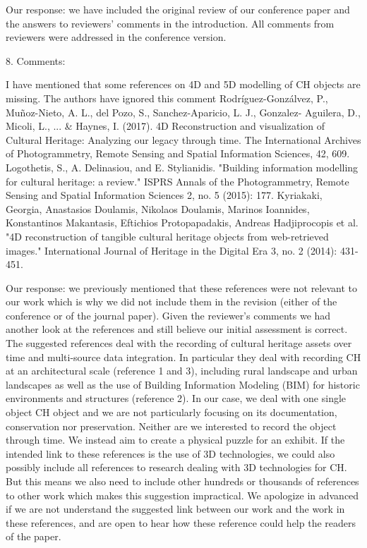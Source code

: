 \documentclass[acmlarge,screen,dvipsnames]{acmart}
\begin{document}
\greenBegin

Our response: we have included the original review of our conference paper and the answers to reviewers’ comments  in the introduction. All comments from reviewers were addressed in the conference version.

\greenEnd


8. Comments:

I have mentioned that some references on 4D and 5D modelling of CH objects are missing. The authors have ignored this comment
Rodríguez-Gonzálvez, P., Muñoz-Nieto, A. L., del Pozo, S., Sanchez-Aparicio, L. J., Gonzalez- Aguilera, D., Micoli, L., ... \& Haynes, I. (2017). 4D Reconstruction and visualization of Cultural Heritage: Analyzing our legacy through time. The International Archives of Photogrammetry,
Remote Sensing and Spatial Information Sciences, 42, 609.
Logothetis, S., A. Delinasiou, and E. Stylianidis. "Building information modelling for cultural heritage: a review." ISPRS Annals of the Photogrammetry, Remote Sensing and Spatial Information Sciences 2, no. 5 (2015): 177.
Kyriakaki, Georgia, Anastasios Doulamis, Nikolaos Doulamis, Marinos Ioannides, Konstantinos Makantasis, Eftichios Protopapadakis, Andreas Hadjiprocopis et al. "4D reconstruction of tangible cultural heritage objects from web-retrieved images." International Journal of Heritage in the Digital Era 3, no. 2 (2014): 431-451.

\greenBegin

Our response: we previously mentioned that these references were not relevant to our work which is why we did not include them in the revision (either of the conference or of the journal paper). Given the reviewer's comments we  had another look at the references and still believe our initial assessment is correct. The suggested references deal with the recording of cultural heritage assets over time and multi-source data integration. In particular they deal with recording CH at an architectural scale (reference 1 and 3), including rural landscape and urban landscapes as well as the use of Building Information Modeling (BIM) for historic environments and structures (reference 2). In our case, we deal with one single object CH object and we are not particularly focusing on its documentation, conservation nor preservation. Neither are we interested to record the object through time. We instead aim to create a physical puzzle for an exhibit. If the intended link to these references is the use of 3D technologies, we could also possibly include all references to research dealing with 3D technologies for CH. But this means we also need to include other hundreds or thousands of references to other work which makes this suggestion impractical. We apologize in advanced if we are not understand the suggested link between our work and the work in these references, and are open to hear how these reference could help the readers of the paper.
\end{document}
